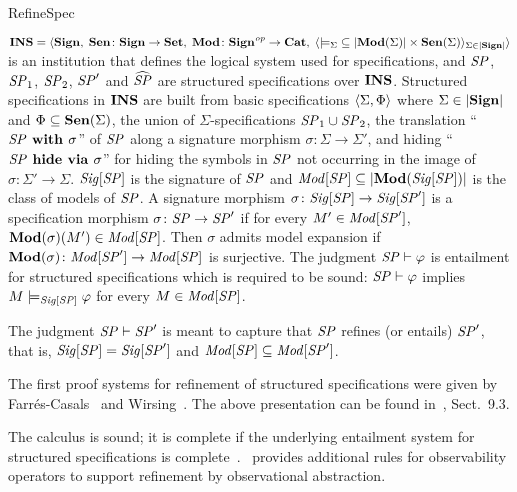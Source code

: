 \begin{entry}{RefineSpec}
\begin{clarifications}
  ${\bf INS} = \langle{{\bf Sign},\; {\bf Sen}\colon{\bf Sign}\to{\bf Set},\; {\bf Mod}\colon{\bf Sign}^{\mathit{op}}\to{\bf Cat},\;
        \langle{{\models_\Sigma}\subseteq|{\bf Mod}(\Sigma)|\times{\bf Sen}(\Sigma)}\rangle_{\Sigma\in|{\bf Sign}|}}\rangle$
  is an institution that defines the logical system used for specifications, and
  $\mathit{SP}$, $\mathit{SP}_1$, $\mathit{SP}_2$, $\mathit{SP}'$ and $\widehat{\mathit{SP}}$ are structured specifications over ${\bf INS}$.
  Structured specifications in ${\bf INS}$ are built from basic specifications
  $\langle{\Sigma, \Phi}\rangle$ where $\Sigma\in|{\bf Sign}|$ and $\Phi\subseteq{\bf Sen}(\Sigma)$,
  the union of $\Sigma$-specifications $\mathit{SP}_1 \cup \mathit{SP}_2$,
  the translation ``$\mathit{SP}\textbf{\upshape{} with }\sigma$'' of $\mathit{SP}$
  along a signature morphism $\sigma\colon\Sigma\to\Sigma'$,
  and hiding ``$\mathit{SP}\textbf{\upshape{} hide via }\sigma$'' for hiding the symbols in $\mathit{SP}$
  not occurring in the image of $\sigma\colon\Sigma'\to\Sigma$.
  ${\mathit{Sig}}[\mathit{SP}]$ is the signature of $\mathit{SP}$ and
  ${\mathit{Mod}}[\mathit{SP}]\subseteq|{\bf Mod}({\mathit{Sig}}[\mathit{SP}])|$ is the class of models of $\mathit{SP}$.
  A signature morphism $\sigma\colon{\mathit{Sig}}[\mathit{SP}]\to{\mathit{Sig}}[\mathit{SP}']$
  is a specification morphism $\sigma\colon\mathit{SP}\to\mathit{SP}'$
  if for every $M'\in{\mathit{Mod}}[\mathit{SP}']$, ${\bf Mod}(\sigma)(M')\in{\mathit{Mod}}[\mathit{SP}]$.
  Then $\sigma$ admits model expansion
  if ${\bf Mod}(\sigma)\colon{\mathit{Mod}}[\mathit{SP}']\to{\mathit{Mod}}[\mathit{SP}]$ is surjective.
  The judgment $\mathit{SP}\vdash\varphi$ is entailment for structured specifications
  which is required to be sound:
  $\mathit{SP}\vdash\varphi$ implies $M\models_{{\mathit{Sig}}[\mathit{SP}]}\varphi$
  for every $M\in{\mathit{Mod}}[\mathit{SP}]$.
  
  The judgment $\mathit{SP}\vdash\mathit{SP}'$ is meant to capture that
  $\mathit{SP}$ refines (or entails) $\mathit{SP}'$, that is,
  ${\mathit{Sig}}[\mathit{SP}] = {\mathit{Sig}}[\mathit{SP}']$ and ${\mathit{Mod}}[\mathit{SP}]\subseteq{\mathit{Mod}}[\mathit{SP}']$.
\end{clarifications}

\begin{history}
  The first proof systems for refinement of structured specifications were given
  by Farr\'es-Casals~\cite{Far89} and Wirsing~\cite{Wir91}.  
  The above presentation can be found in~\cite{ST12}, Sect.~9.3.  
\end{history}

\begin{technicalities}
  The calculus is sound; it is complete if the underlying entailment system for
  structured specifications is complete~\cite{Wir91, ST12}. 
  \cite{RH97}~provides additional rules for observability operators to support
  refinement by observational abstraction.
\end{technicalities}

\end{entry}
